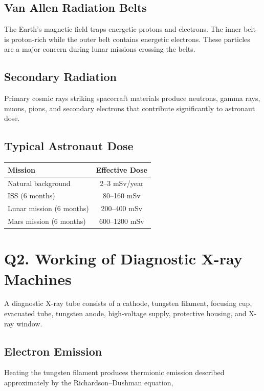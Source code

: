 \documentclass[12pt]{article}
\begin{document}
\subsection*{Van Allen Radiation Belts}

The Earth's magnetic field traps energetic protons and electrons. The inner belt is proton-rich while the outer belt contains energetic electrons. These particles are a major concern during lunar missions crossing the belts.

\subsection*{Secondary Radiation}

Primary cosmic rays striking spacecraft materials produce neutrons, gamma rays, muons, pions, and secondary electrons that contribute significantly to astronaut dose.

\subsection*{Typical Astronaut Dose}

\begin{center}
\begin{tabular}{lc}
\toprule
Mission & Effective Dose \\
\midrule
Natural background & 2--3 mSv/year\\
ISS (6 months) & 80--160 mSv\\
Lunar mission (6 months) & 200--400 mSv\\
Mars mission (6 months) & 600--1200 mSv\\
\bottomrule
\end{tabular}
\end{center}

\section*{Q2. Working of Diagnostic X-ray Machines}

A diagnostic X-ray tube consists of a cathode, tungsten filament, focusing cup, evacuated tube, tungsten anode, high-voltage supply, protective housing, and X-ray window.

\subsection*{Electron Emission}

Heating the tungsten filament produces thermionic emission described approximately by the Richardson--Dushman equation,
\end{document}
